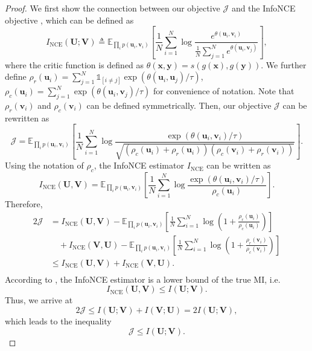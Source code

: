 \documentclass{article}
\theoremstyle{remark}
\begin{document}
\begin{proof}
We first show the connection between our objective \(\mathcal{J}\) and the InfoNCE objective \cite{vandenOord:2018ut} , which can be defined as \cite{Poole:2019vk}
\[I_\text{NCE}(\mathbf U; \mathbf V) \triangleq \mathbb{E}_{\prod_{i} p( {\bm u}_i, {\bm v}_i)} \left[ \frac{1}{N} \sum_{i=1}^N \log \frac{e^{\theta(\bm{u}_i, \bm{v}_i)}}{\frac{1}{N}\sum_{j = 1}^{N} e^{\theta(\bm{u}_i, \bm{v}_j)}} \right], \]
where the critic function is defined as \(\theta (\bm{x}, \bm{y}) = s(g(\bm{x}), g(\bm{y}))\).
We further define \(\rho_r({\bm{u}}_i) = \sum_{j=1}^N \mathds 1_{[i \neq j]} \exp(\theta({\bm u}_i, {\bm u}_j) / \tau)\), \(\rho_c({\bm u}_i) = \sum_{j=1}^N \exp(\theta ({\bm u}_i, {\bm v}_j) / \tau)\) for convenience of notation.
Note that \(\rho_r({\bm v}_i)\) and \(\rho_c({\bm v}_i)\) can be defined symmetrically.
Then, our objective \(\mathcal{J}\) can be rewritten as
\begin{equation}
	\mathcal{J} = \mathbb E_{\prod_{i} p( {\bm u}_i, {\bm v}_i)} \left[ \frac{1}{N} \sum_{i=1}^N \log \frac {\exp(\theta( {\bm u}_i, {\bm v}_i) / \tau)} {\sqrt{\left( \rho_c( {\bm u}_i) + \rho_r({\bm u}_i) \right) \left( \rho_c( {\bm v}_i) + \rho_r({\bm v}_i) \right)}} \right].
\end{equation}
Using the notation of \(\rho_c\), the InfoNCE estimator \(I_\text{NCE}\) can be written as
\begin{equation}
	I_\text{NCE}( {\mathbf U}, {\mathbf V}) = \mathbb E_{\prod_{i} p( {\bm u}_i, {\bm v}_i)} \left[ \frac{1}{N} \sum_{i=1}^N \log \frac {\exp(\theta( {\bm u}_i, {\bm v}_i) / \tau)} {\rho_{c}( {\bm u}_i)} \right].
\end{equation}
Therefore,
\begin{equation}
	\begin{aligned}
		2\mathcal{J} & = I_\text{NCE}(\mathbf U, \mathbf V) - \mathbb E_{\prod_i p( {\mathbf u}_i,  {\bm v}_i)} \left[ \frac{1}{N} \sum_{i=1}^N \log \left( 1 + \frac {\rho_r( {\bm u}_i)} {\rho_c( {\bm u}_i)} \right) \right] \\
		& \quad + I_\text{NCE}(\mathbf V, \mathbf U) - \mathbb E_{\prod_i p( {\bm u}_i, {\bm v}_i)} \left[ \frac{1}{N} \sum_{i=1}^N \log \left( 1 + \frac {\rho_r( {\bm v}_i)} {\rho_c( {\bm v}_i)} \right) \right] \\
		& \leq I_\text{NCE}(\mathbf U, \mathbf V) + I_\text{NCE}(\mathbf V, \mathbf U). \\
	\end{aligned}
\end{equation}
According to \cite{Poole:2019vk}, the InfoNCE estimator is a lower bound of the true MI, i.e.
\begin{equation}
	I_\text{NCE}(\mathbf{U}, \mathbf{V}) \le I(\mathbf{U}; \mathbf{V}).
\end{equation}
Thus, we arrive at
\begin{equation}
	 2\mathcal{J} \leq I(\mathbf U; \mathbf V) + I(\mathbf V; \mathbf U) = 2 I(\mathbf U; \mathbf V),
\end{equation}
which leads to the inequality
\begin{equation}
\label{eq:objective-uv}
\mathcal J \le I( {\mathbf U}; {\mathbf V}).
\end{equation}


\end{proof}
\end{document}
